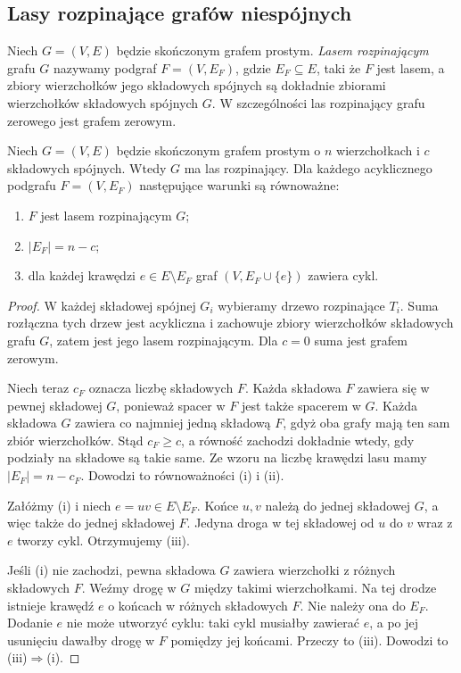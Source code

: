 \subsection{Lasy rozpinające grafów niespójnych}
\label{sec:tg-lasy-rozpinajace}

\begin{definicja}
Niech $G=(V,E)$ będzie skończonym grafem prostym.
\emph{Lasem rozpinającym} grafu $G$ nazywamy podgraf
$F=(V,E_F)$, gdzie $E_F\subseteq E$, taki że $F$ jest
lasem, a zbiory wierzchołków jego składowych spójnych
są dokładnie zbiorami wierzchołków składowych spójnych
$G$. W szczególności las rozpinający grafu zerowego
jest grafem zerowym.
\end{definicja}

\begin{twierdzenie}
\label{thm:tg-las-rozpinajacy}
Niech $G=(V,E)$ będzie skończonym grafem prostym
o $n$ wierzchołkach i $c$ składowych spójnych.
Wtedy $G$ ma las rozpinający. Dla każdego acyklicznego
podgrafu $F=(V,E_F)$ następujące warunki są równoważne:
\begin{enumerate}[label=(\roman*)]
\item $F$ jest lasem rozpinającym $G$;
\item $|E_F|=n-c$;
\item dla każdej krawędzi $e\in E\setminus E_F$
      graf $(V,E_F\cup\{e\})$ zawiera cykl.
\end{enumerate}
\end{twierdzenie}

\begin{proof}
W każdej składowej spójnej $G_i$ wybieramy drzewo
rozpinające $T_i$. Suma rozłączna tych drzew jest
acykliczna i zachowuje zbiory wierzchołków składowych
grafu $G$, zatem jest jego lasem rozpinającym.
Dla $c=0$ suma jest grafem zerowym.

Niech teraz $c_F$ oznacza liczbę składowych $F$.
Każda składowa $F$ zawiera się w pewnej składowej
$G$, ponieważ spacer w $F$ jest także spacerem w $G$.
Każda składowa $G$ zawiera co najmniej jedną składową
$F$, gdyż oba grafy mają ten sam zbiór wierzchołków.
Stąd $c_F\ge c$, a równość zachodzi dokładnie wtedy,
gdy podziały na składowe są takie same. Ze wzoru na
liczbę krawędzi lasu mamy $|E_F|=n-c_F$. Dowodzi to
równoważności (i) i (ii).

Załóżmy (i) i niech $e=uv\in E\setminus E_F$.
Końce $u,v$ należą do jednej składowej $G$, a więc
także do jednej składowej $F$. Jedyna droga w tej
składowej od $u$ do $v$ wraz z $e$ tworzy cykl.
Otrzymujemy (iii).

Jeśli (i) nie zachodzi, pewna składowa $G$ zawiera
wierzchołki z różnych składowych $F$. Weźmy drogę
w $G$ między takimi wierzchołkami. Na tej drodze
istnieje krawędź $e$ o końcach w różnych składowych
$F$. Nie należy ona do $E_F$. Dodanie $e$ nie może
utworzyć cyklu: taki cykl musiałby zawierać $e$,
a po jej usunięciu dawałby drogę w $F$ pomiędzy jej
końcami. Przeczy to (iii). Dowodzi to (iii)$\Rightarrow$(i).
\end{proof}

